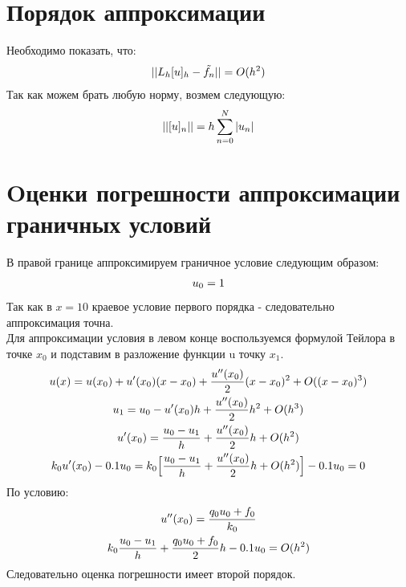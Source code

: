 \documentclass[titlepage]{article}
\begin{document}
\section{Порядок аппроксимации}
	Необходимо показать, что:
\begin{gather}
	\notag ||L_h[u]_h - \tilde{f_n}|| = O(h^2)
\end{gather}
Так как можем брать любую норму, возмем следующую:
\begin{gather}
	\notag ||[u]_n|| = h\sum_{n = 0}^{N}|u_n|
\end{gather}
\section{Oценки погрешности аппроксимации граничных условий}
В правой границе аппроксимируем граничное условие следующим образом:
\begin{gather}
	\notag u_0 = 1
\end{gather}
Так как в $x = 10$ краевое условие первого порядка - следовательно аппроксимация точна.\\
Для аппроксимации условия в левом конце воспользуемся формулой Тейлора в точке $x_0$ и подставим в разложение функции u точку $x_1$.
\begin{gather}
	\notag u(x) = u(x_0) + u'(x_0)(x - x_0) + \frac{u''(x_0)}{2}(x - x_0)^2 + O((x -x_0)^3) \\
	\notag u_1 = u_0 - u'(x_0)h + \frac{u''(x_0)}{2}h^2 + O(h^3)\\
	\notag u'(x_0) = \frac{u_0 - u_1}{h} + \frac{u''(x_0)}{2}h + O(h^2)\\
	\notag k_0u'(x_0) - 0.1u_0 = k_0\Big[\frac{u_0 - u_1}{h} + \frac{u''(x_0)}{2}h + O(h^2)\Big] - 0.1u_0 = 0 
\end{gather}
По условию:
\begin{gather}
	\notag u''(x_0) = \frac{q_0u_0 + f_0}{k_0}\\
	\notag k_0\frac{u_0 - u_1}{h} + \frac{q_{0}u_0 + f_0}{2}h - 0.1u_0 = O(h^2)
\end{gather}
Следовательно оценка погрешности имеет второй порядок.
\end{document}
